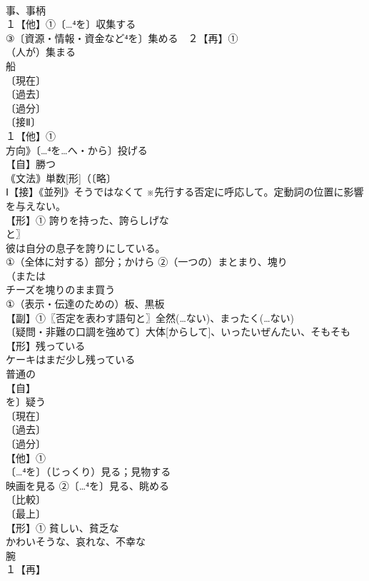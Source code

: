 \documentclass[8pt]{extreport}
\begin{document}
\begin{CJK}{UTF8}{min}
\\	事、事柄
\\	１【他】①〔…⁴を〕収集する 
\\	③〔資源・情報・資金など⁴を〕集める　２【再】①
\\	（人が）集まる
\\	船 
\\	〔現在〕
\\	〔過去〕
\\	〔過分〕
\\	〔接Ⅱ〕
\\	１【他】①
\\	方向》〔…⁴を…へ・から〕投げる 
\\	【自】勝つ 
\\	｟文法｠単数[形]（〔略〕
\\	Ⅰ【接】《並列》そうではなくて ※先行する否定に呼応して。定動詞の位置に影響を与えない。 
\\	【形】① 誇りを持った、誇らしげな 
\\	と〗
\\	彼は自分の息子を誇りにしている。
\\	①（全体に対する）部分；かけら ②（一つの）まとまり、塊り 
\\	（または
\\	チーズを塊りのまま買う
\\	①（表示・伝達のための）板、黒板
\\	【副】①〖否定を表わす語句と〗全然(…ない)、まったく(…ない) 
\\	〔疑問・非難の口調を強めて〕大体[からして]、いったいぜんたい、そもそも
\\	【形】残っている 
\\	ケーキはまだ少し残っている 
\\	普通の
\\	【自】
\\	を〕疑う 
\\	〔現在〕
\\	〔過去〕
\\	〔過分〕
\\	【他】①
\\	〔…⁴を〕（じっくり）見る；見物する 
\\	映画を見る ②〔…⁴を〕見る、眺める 
\\	〔比較〕
\\	〔最上〕
\\	【形】① 貧しい、貧乏な 
\\	かわいそうな、哀れな、不幸な 
\\	腕
\\	１【再】

\end{CJK}
\end{document}
